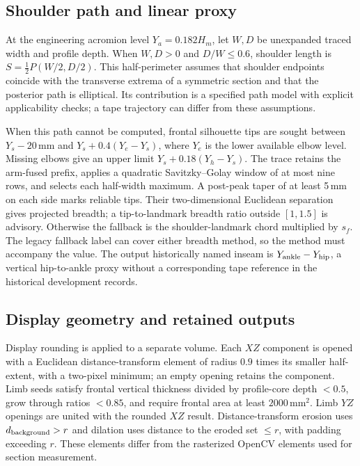\documentclass[11pt,a4paper]{article}
\begin{document}
\subsection{Shoulder path and linear proxy}
At the engineering acromion level $Y_a=0.182H_m$, let $W,D$ be unexpanded traced width and profile depth. When $W,D>0$ and $D/W\leq0.6$, shoulder length is $S=\tfrac12P(W/2,D/2)$. This half-perimeter assumes that shoulder endpoints coincide with the transverse extrema of a symmetric section and that the posterior path is elliptical. Its contribution is a specified path model with explicit applicability checks; a tape trajectory can differ from these assumptions.

When this path cannot be computed, frontal silhouette tips are sought between $Y_s-20$\,mm and $Y_s+0.4(Y_e-Y_s)$, where $Y_e$ is the lower available elbow level. Missing elbows give an upper limit $Y_s+0.18(Y_h-Y_s)$. The trace retains the arm-fused prefix, applies a quadratic Savitzky--Golay window of at most nine rows, and selects each half-width maximum. A post-peak taper of at least 5\,mm on each side marks reliable tips. Their two-dimensional Euclidean separation gives projected breadth; a tip-to-landmark breadth ratio outside $[1,1.5]$ is advisory. Otherwise the fallback is the shoulder-landmark chord multiplied by $s_f$. The legacy fallback label can cover either breadth method, so the method must accompany the value. The output historically named inseam is $Y_{\rm ankle}-Y_{\rm hip}$, a vertical hip-to-ankle proxy without a corresponding tape reference in the historical development records.

\subsection{Display geometry and retained outputs}
Display rounding is applied to a separate volume. Each $XZ$ component is opened with a Euclidean distance-transform element of radius $0.9$ times its smaller half-extent, with a two-pixel minimum; an empty opening retains the component. Limb seeds satisfy frontal vertical thickness divided by profile-core depth $<0.5$, grow through ratios $<0.85$, and require frontal area at least $2000$\,mm$^2$. Limb $YZ$ openings are united with the rounded $XZ$ result. Distance-transform erosion uses $d_{\rm background}>r$ and dilation uses distance to the eroded set $\leq r$, with padding exceeding $r$. These elements differ from the rasterized OpenCV elements used for section measurement.
\end{document}

